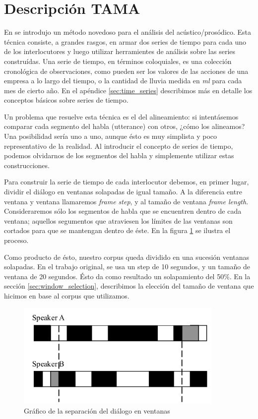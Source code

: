 \section{Descripción TAMA}

En \cite{KOU2008} se introdujo un método novedoso para el análisis del \entrainment acústico/prosódico. Esta técnica consiste, a grandes rasgos, en armar dos series de tiempo para cada uno de los interlocutores y luego utilizar herramientes de análisis sobre las series construídas. Una serie de tiempo, en términos coloquiales, es una colección cronológica de observaciones, como pueden ser los valores de las acciones de una empresa a lo largo del tiempo, o la cantidad de lluvia medida en \emph{ml} para cada mes de cierto año. En el apéndice \ref{sec:time_series} describimos más en detalle los conceptos básicos sobre series de tiempo.

Un problema que resuelve esta técnica es el del alineamiento: si intentásemos comparar cada segmento del habla (utterance) con otros, ¿cómo los alineamos? Una posibilidad sería uno a uno, aunque ésto es muy simplista y poco representativo de la realidad. Al introducir el concepto de series de tiempo, podemos olvidarnos de los segmentos del habla y simplemente utilizar estas construcciones.

Para construir la serie de tiempo de cada interlocutor debemos, en primer lugar, dividir el diálogo en ventanas solapadas de igual tamaño. A la diferencia entre ventana y ventana llamaremos \emph{frame step}, y al tamaño de ventana \emph{frame length}. Consideraremos sólo los segmentos de habla que se encuentren dentro de cada ventana; aquellos segumentos que atraviesen los límites de las ventanas son cortados para que se mantengan dentro de éste. En la figura \ref{tama} se ilustra el proceso.

Como producto de ésto, nuestro corpus queda dividido en una sucesión ventanas solapadas. En el trabajo original, se usa un step de 10 segundos, y un tamaño de ventana de 20 segundos. Ésto da como resultado un solapamiento del 50\%. En la sección \ref{sec:window_selection}, describimos la elección del tamaño de ventana que hicimos en base al corpus que utilizamos.

\begin{figure}
\centering
\includegraphics[width=10cm]{images/tama.png}
\caption{Gráfico de la separación del diálogo en ventanas}
\label{tama}
\end{figure}

